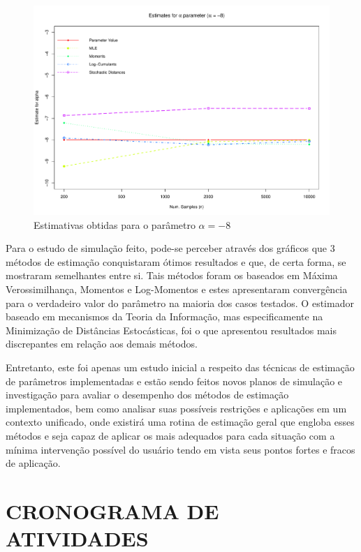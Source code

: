 \documentclass[12pt]{article}
\begin{document}
\begin{figure}[H]
     \centering
     \includegraphics[scale=0.5]{plots/ComparisonAlpha-8.pdf}
     \caption{Estimativas obtidas para o parâmetro $\alpha = -8$}
     \label{graf_7}
\end{figure}

Para o estudo de simulação feito, pode-se perceber através dos gráficos que 3 métodos de estimação conquistaram ótimos resultados e que, de certa forma, se mostraram semelhantes entre si. Tais métodos foram os baseados em Máxima Verossimilhança, Momentos e Log-Momentos e estes apresentaram convergência para o verdadeiro valor do parâmetro na maioria dos casos testados. O estimador baseado em mecanismos da Teoria da Informação, mas especificamente na Minimização de Distâncias Estocásticas, foi o que apresentou resultados mais discrepantes em relação aos demais métodos.

Entretanto, este foi apenas um estudo inicial a respeito das técnicas de estimação de parâmetros implementadas e estão sendo feitos novos planos de simulação e investigação para avaliar o desempenho dos métodos de estimação implementados, bem como analisar suas possíveis restrições e aplicações em um contexto unificado, onde existirá uma rotina de estimação geral que engloba esses métodos e seja capaz de aplicar os mais adequados para cada situação com a mínima intervenção possível do usuário tendo em vista seus pontos fortes e fracos de aplicação. 


\newpage
\section*{\centering \textbf{CRONOGRAMA DE ATIVIDADES}}
\vspace{0.5cm}
\end{document}
